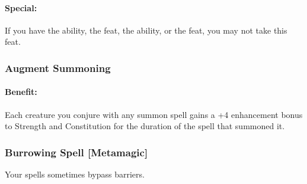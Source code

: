 \paragraph{Special:} If you have the  ability, the  feat, the  ability, or the  feat, you may not take this feat.

\subsubsection{Augment Summoning}
\label{Feat:AugmentSummoning}
\paragraph{Benefit:}
Each creature you conjure with any summon spell gains a +4 enhancement bonus to Strength and Constitution for the duration of the spell that summoned it.


\subsubsection[Burrowing Spell]{Burrowing Spell [Metamagic]}
\label{Feat:BurrowingSpell}
Your spells sometimes bypass barriers.

